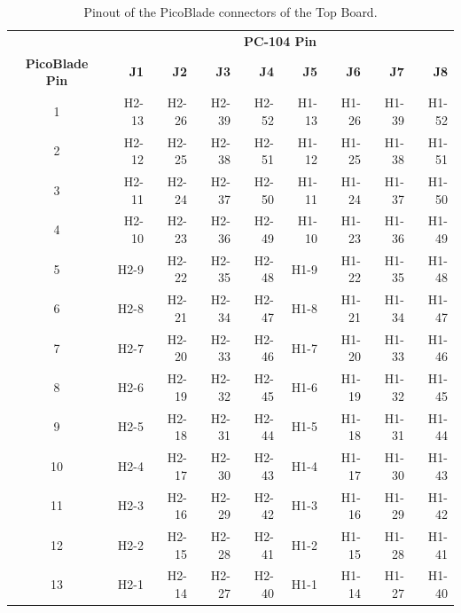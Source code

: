 \begin{table}[!h]
    \centering
    \begin{tabular}{crrrrrrrr}
        \toprule[1.5pt]
                               & \multicolumn{8}{c}{\textbf{PC-104 Pin}} \\
        \textbf{PicoBlade Pin} & \textbf{J1} & \textbf{J2} & \textbf{J3} & \textbf{J4} & \textbf{J5} & \textbf{J6} & \textbf{J7} & \textbf{J8} \\
        \midrule
        1                      & H2-13       & H2-26       & H2-39       & H2-52       & H1-13       & H1-26       & H1-39       & H1-52       \\
        2                      & H2-12       & H2-25       & H2-38       & H2-51       & H1-12       & H1-25       & H1-38       & H1-51       \\
        3                      & H2-11       & H2-24       & H2-37       & H2-50       & H1-11       & H1-24       & H1-37       & H1-50       \\
        4                      & H2-10       & H2-23       & H2-36       & H2-49       & H1-10       & H1-23       & H1-36       & H1-49       \\
        5                      & H2-9        & H2-22       & H2-35       & H2-48       & H1-9        & H1-22       & H1-35       & H1-48       \\
        6                      & H2-8        & H2-21       & H2-34       & H2-47       & H1-8        & H1-21       & H1-34       & H1-47       \\
        7                      & H2-7        & H2-20       & H2-33       & H2-46       & H1-7        & H1-20       & H1-33       & H1-46       \\
        8                      & H2-6        & H2-19       & H2-32       & H2-45       & H1-6        & H1-19       & H1-32       & H1-45       \\
        9                      & H2-5        & H2-18       & H2-31       & H2-44       & H1-5        & H1-18       & H1-31       & H1-44       \\
        10                     & H2-4        & H2-17       & H2-30       & H2-43       & H1-4        & H1-17       & H1-30       & H1-43       \\
        11                     & H2-3        & H2-16       & H2-29       & H2-42       & H1-3        & H1-16       & H1-29       & H1-42       \\
        12                     & H2-2        & H2-15       & H2-28       & H2-41       & H1-2        & H1-15       & H1-28       & H1-41       \\
        13                     & H2-1        & H2-14       & H2-27       & H2-40       & H1-1        & H1-14       & H1-27       & H1-40       \\
        \bottomrule[1.5pt]
    \end{tabular}
    \caption{Pinout of the PicoBlade connectors of the Top Board.}
    \label{tab:pinout-top-board}
\end{table}

